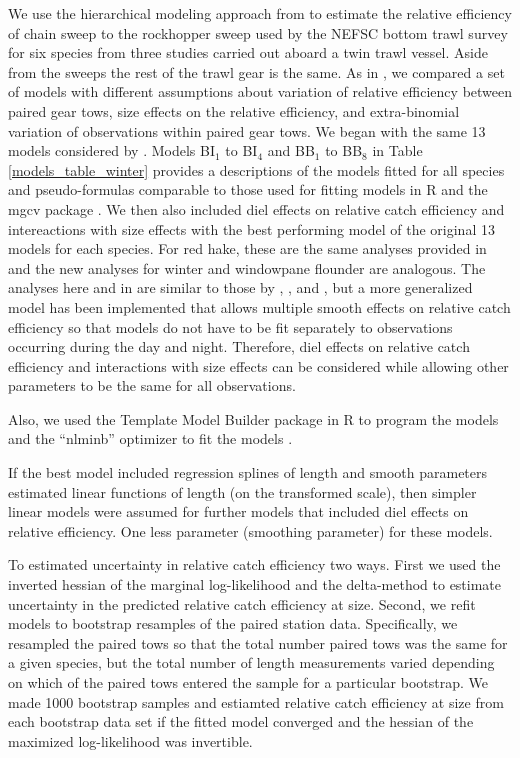 \documentclass[]{article}
\begin{document}
We use the hierarchical modeling approach from \citet{miller13} to
estimate the relative efficiency of chain sweep to the rockhopper sweep
used by the NEFSC bottom trawl survey for six species from three studies
carried out aboard a twin trawl vessel. Aside from the sweeps the rest
of the trawl gear is the same. As in \citet{miller13}, we compared a set
of models with different assumptions about variation of relative
efficiency between paired gear tows, size effects on the relative
efficiency, and extra-binomial variation of observations within paired
gear tows. We began with the same 13 models considered by
\citet{miller13}. Models BI\(_1\) to BI\(_4\) and BB\(_1\) to BB\(_8\)
in Table \ref{models_table_winter} provides a descriptions of the models
fitted for all species and pseudo-formulas comparable to those used for
fitting models in R and the mgcv package \citep{R19, wood06}. We then
also included diel effects on relative catch efficiency and
intereactions with size effects with the best performing model of the
original 13 models for each species. For red hake, these are the same
analyses provided in \citet{milleretal20} and the new analyses for
winter and windowpane flounder are analogous. The analyses here and in
\citet{milleretal20} are similar to those by \citet{milleretal17a},
\citet{milleretal17b}, and \citet{milleretal18}, but a more generalized
model has been implemented that allows multiple smooth effects on
relative catch efficiency so that models do not have to be fit
separately to observations occurring during the day and night.
Therefore, diel effects on relative catch efficiency and interactions
with size effects can be considered while allowing other parameters to
be the same for all observations.

Also, we used the Template Model Builder package
\citep{kristensenetal16} in R to program the models and the ``nlminb''
optimizer to fit the models \citep{R20}.

If the best model included regression splines of length and smooth
parameters estimated linear functions of length (on the transformed
scale), then simpler linear models were assumed for further models that
included diel effects on relative efficiency. One less parameter
(smoothing parameter) for these models.

To estimated uncertainty in relative catch efficiency two ways. First we
used the inverted hessian of the marginal log-likelihood and the
delta-method to estimate uncertainty in the predicted relative catch
efficiency at size. Second, we refit models to bootstrap resamples of
the paired station data. Specifically, we resampled the paired tows so
that the total number paired tows was the same for a given species, but
the total number of length measurements varied depending on which of the
paired tows entered the sample for a particular bootstrap. We made 1000
bootstrap samples and estiamted relative catch efficiency at size from
each bootstrap data set if the fitted model converged and the hessian of
the maximized log-likelihood was invertible.
\end{document}
